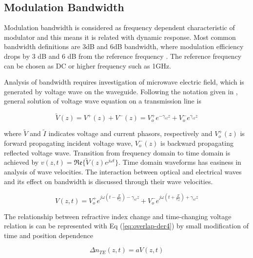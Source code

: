 \documentclass[thesis]{deutez}
\begin{document}
    \subsection{Modulation Bandwidth}
    Modulation bandwidth is considered as frequency dependent characteristic of modulator and this means it is related with dynamic response. Most common bandwidth definitions are 3dB and 6dB bandwidth, where modulation efficiency drops by 3 dB and 6 dB from the reference frequency \cite{1}. The reference frequency can be chosen as DC or higher frequency such as 1GHz. 
    
	Analysis of bandwidth requires investigation of microwave electric field, which is generated by voltage wave on the waveguide. Following the notation given in \cite{16}, general solution of voltage wave equation on a transmission line is  
	
	\begin{equation}
		\tilde{V}(z) = V^{+}(z) + V^{-}(z) = V_o^{+} e^{-\gamma_{el} z} 		+ V_o^{-} e^{\gamma_{el} z}
		\label{eq:general_solution_voltage}
	\end{equation}
	
	
	where $\tilde{V}$ and $\tilde{I}$ indicates voltage and current phasors, respectively and $V_o^{+}(z)$ is forward propagating incident voltage wave, $V_o^{-}(z)$ is backward propagating reflected voltage wave.  Transition from frequency domain to time domain is achieved by $v(z,t) = \mathfrak{Re}\{\tilde{V}(z) e^{j\omega t} \}$. Time domain waveforms has easiness in analysis of wave velocities.  The interaction between optical and electrical waves and its effect on bandwidth is discussed through their wave velocities.     
	
	\begin{equation}
		V(z,t) = V_o^{+} e^{j\omega(t-\frac{Z}{v_{el}})-\gamma_{el} z} + V_o^{-} e^{j\omega(t+\frac{Z}{v_{el}})  +  \gamma_{el} z}
		\label{eq:general_solution_voltage_time}
	\end{equation}
	
	The relationship between refractive index change and time-changing voltage relation is can be represented with Eq (\ref{eq:overlap-der4}) by small modification of time and position dependence
	
	\begin{equation}
		\Delta n_{TE}(z,t) = aV(z,t)
		\label{eq:n_V_relation}
	\end{equation}
\end{document}
